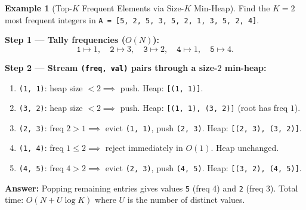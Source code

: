 \documentclass[11pt,a4paper]{article}
\theoremstyle{definition}
\newtheorem{example}{Example}[section]
\begin{document}
\begin{example}[Top-$K$ Frequent Elements via Size-$K$ Min-Heap]
Find the $K = 2$ most frequent integers in \texttt{A = [5, 2, 5, 3, 5, 2, 1, 3, 5, 2, 4]}.

\textbf{Step 1 --- Tally frequencies ($O(N)$):}
$$\texttt{1} \mapsto 1,\quad \texttt{2} \mapsto 3,\quad \texttt{3} \mapsto 2,\quad \texttt{4} \mapsto 1,\quad \texttt{5} \mapsto 4.$$

\textbf{Step 2 --- Stream \texttt{(freq, val)} pairs through a size-$2$ min-heap:}
\begin{enumerate}[itemsep=1pt, topsep=2pt]
    \item \texttt{(1, 1)}: heap size $< 2 \implies$ push. Heap: \texttt{[(1, 1)]}.
    \item \texttt{(3, 2)}: heap size $< 2 \implies$ push. Heap: \texttt{[(1, 1), (3, 2)]} (root has freq $1$).
    \item \texttt{(2, 3)}: freq $2 > 1 \implies$ evict \texttt{(1, 1)}, push \texttt{(2, 3)}. Heap: \texttt{[(2, 3), (3, 2)]}.
    \item \texttt{(1, 4)}: freq $1 \le 2 \implies$ reject immediately in $O(1)$. Heap unchanged.
    \item \texttt{(4, 5)}: freq $4 > 2 \implies$ evict \texttt{(2, 3)}, push \texttt{(4, 5)}. Heap: \texttt{[(3, 2), (4, 5)]}.
\end{enumerate}

\textbf{Answer:} Popping remaining entries gives values \texttt{5} (freq 4) and \texttt{2} (freq 3). Total time: $O(N + U \log K)$ where $U$ is the number of distinct values.
\end{example}
\end{document}
